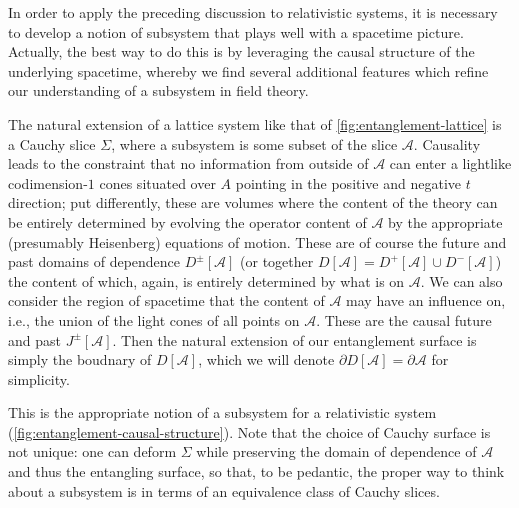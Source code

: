 \documentclass{report}
\begin{document}
 In order to apply the preceding discussion 
to relativistic systems, it is necessary to develop a notion of subsystem that 
plays well with a spacetime picture. Actually, the best way to do this is by 
leveraging the causal structure of the underlying spacetime, whereby we find 
several additional features which refine our understanding of a subsystem 
in field theory. 

The natural extension of a lattice system like that of \cref{fig:entanglement-lattice} 
is a Cauchy slice $ \Sigma $, where a subsystem is some subset of the slice 
$ \mathcal{A} $. Causality leads to the constraint that no information from 
outside of $ \mathcal{A} $ can enter a lightlike codimension-$ 1 $ cones 
situated over $ A $ pointing in the positive and negative $ t $ direction; put 
differently, these are volumes where the content of the theory can be entirely 
determined by evolving the operator content of $ \mathcal{A} $ by the appropriate 
(presumably Heisenberg) equations of motion. These are of course the future 
and past domains of dependence $ D^{\pm}[\mathcal{A}] $ (or together $ D[\mathcal{A}]
= D^+ [\mathcal{A}] \cup D^- [\mathcal{A}]$) the content of which, 
again, is entirely determined by what is on $ \mathcal{A} $. We can also consider 
the region of spacetime that the content of $ \mathcal{A}$  may have an influence on, 
i.e., the union of the light cones of all points on $ \mathcal{A} $. These 
are the causal future and past $ J^{\pm}[\mathcal{A}] $. Then the natural 
extension of our entanglement surface is simply the boudnary of $ D[\mathcal{A}] $,
which we will denote $ \partial D[\mathcal{A}] = \partial \mathcal{A} $ for 
simplicity. 

This is the appropriate notion of a subsystem for a relativistic 
system (\cref{fig:entanglement-causal-structure}). Note that the choice of 
Cauchy surface is not unique: one can deform $ \Sigma $ while preserving the 
domain of dependence of $ \mathcal{A} $ and thus the entangling surface, so
that, to be pedantic, the proper way to think about a subsystem is in terms of
an equivalence class of Cauchy slices.
\end{document}
